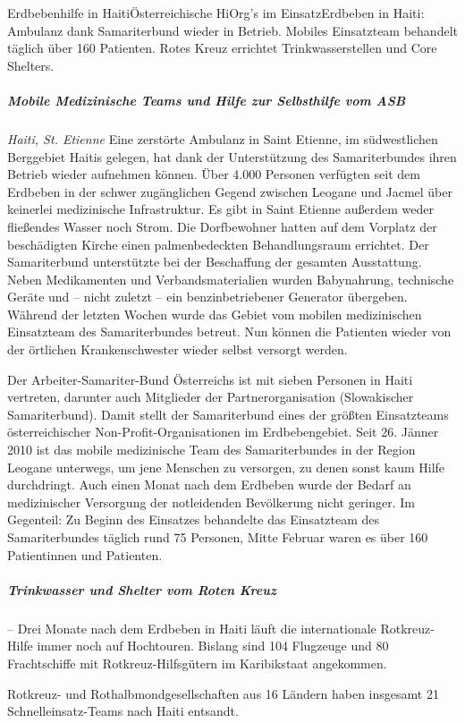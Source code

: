 \begin{NewsItem}{}{Erdbebenhilfe in Haiti}{Österreichische HiOrg's im
Einsatz}{Erdbeben in Haiti: Ambulanz dank Samariterbund wieder in Betrieb.
Mobiles Einsatzteam behandelt täglich über 160 Patienten. Rotes Kreuz errichtet
Trinkwasserstellen und Core Shelters.} {}

\subparagraph{Mobile Medizinische Teams und Hilfe zur Selbsthilfe vom ASB}
\emph{Haiti, St. Etienne} Eine zerstörte Ambulanz in Saint Etienne, im
südwestlichen Berggebiet Haitis gelegen, hat dank der Unterstützung des
Samariterbundes ihren Betrieb wieder aufnehmen können. Über 4.000 Personen
verfügten seit dem Erdbeben in der schwer zugänglichen Gegend zwischen Leogane
und Jacmel über keinerlei medizinische Infrastruktur. Es gibt in Saint Etienne
außerdem weder fließendes Wasser noch Strom. Die Dorfbewohner hatten auf dem
Vorplatz der beschädigten Kirche einen palmenbedeckten Behandlungsraum errichtet.
Der Samariterbund unterstützte bei der Beschaffung der gesamten Ausstattung.
Neben Medikamenten und Verbandsmaterialien wurden Babynahrung, technische Geräte
und – nicht zuletzt – ein benzinbetriebener Generator übergeben. Während der
letzten Wochen wurde das Gebiet vom mobilen medizinischen Einsatzteam des
Samariterbundes betreut. Nun können die Patienten wieder von der örtlichen
Krankenschwester wieder selbst versorgt werden.

Der Arbeiter-Samariter-Bund Österreichs ist mit sieben Personen in Haiti
vertreten, darunter auch Mitglieder der Partnerorganisation 
(Slowakischer Samariterbund). Damit stellt der Samariterbund eines der größten
Einsatzteams österreichischer Non-Profit-Organisationen im Erdbebengebiet. Seit
26. Jänner 2010 ist das mobile medizinische Team des Samariterbundes in der
Region Leogane unterwegs, um jene Menschen zu versorgen, zu denen sonst kaum
Hilfe durchdringt. Auch einen Monat nach dem Erdbeben wurde der Bedarf an
medizinischer Versorgung der notleidenden Bevölkerung nicht geringer. Im
Gegenteil: Zu Beginn des Einsatzes behandelte das Einsatzteam des Samariterbundes
täglich rund 75 Personen, Mitte Februar waren es über 160 Patientinnen und
Patienten.

\subparagraph{Trinkwasser und Shelter vom Roten Kreuz} 
 -- Drei Monate nach dem Erdbeben in Haiti läuft die
internationale Rotkreuz-Hilfe immer noch auf Hochtouren. Bislang sind 104
Flugzeuge und 80 Frachtschiffe mit Rotkreuz-Hilfsgütern im Karibikstaat
angekommen.

Rotkreuz- und Rothalbmondgesellschaften aus 16 Ländern haben insgesamt 21
Schnelleinsatz-Teams nach Haiti entsandt.


\end{NewsItem}
